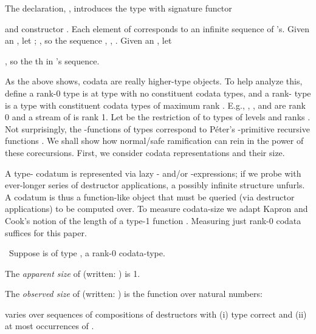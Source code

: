 \documentclass[envcountsame]{llncs}
\newcommand{\Topic}[1]{\smallskip\noindent{\textbf{#1{.}}}\enspace}
\begin{document}
\begin{example}\label{ex:nats}
  The declaration,   ,
  introduces the type  with signature functor 
   
  and  constructor .
  Each element of  corresponds to an infinite 
  sequence of 's.
  Given an , let 
  ;
  ,
  so  the sequence , , .
  Given an , let 
   
  , 
   so  the th  in  's sequence. 
\end{example}

As the above shows, codata are really higher-type objects.  To help
analyze this, define
a rank-0 type is at type with no constituent codata types, and
a rank- type is a type with constituent codata types of maximum rank .
E.g., , , and  are rank 0 and a stream of
 is rank 1.  Let  be the restriction of  to types of
levels  and 
ranks .
Not surprisingly, the -functions of types
 correspond to P\'eter's
-primitive recursive functions \cite{Longley:notions:1}.
We shall show how normal/safe ramification can rein in the power of
these corecursions.  First, we consider codata representations and
their size.














\Topic{Representation and Size}
A type- codatum  is represented via lazy -
and/or -expressions; if we probe  with ever-longer
series of destructor applications, a possibly infinite structure
unfurls.  A codatum is thus a function-like object that must be
queried (via destructor applications) to be computed over.  To
measure codata-size we adapt Kapron and Cook's notion of the length
of a type-1 function \cite{KapronCook:mach}.  Measuring just rank-0
codata suffices for this paper.

\begin{definition}  \label{d:ob:size} \
Suppose  is of type , a rank-0 codata-type.
  
  \begin{asparaenum}[(a)]
  \item 
The \emph{apparent size} of  (written:
    ) is 1.


  \item 
The \emph{observed size} of  (written:
    ) is the function over natural numbers:
    
    varies over sequences of compositions of destructors with (i)
     type correct and (ii) at most  occurrences of
    .



  \end{asparaenum}
\end{definition}
\end{document}

